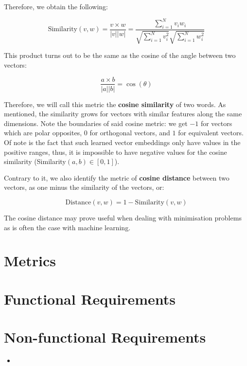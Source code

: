 Therefore, we obtain the following:

$$ \text{Similarity} (v, w) = \frac{v \times w}{|v| |w|} = \frac{\sum_{i=1}^{N} v_i w_i}{\sqrt{\sum_{i=1}^{N}v_i^2} \sqrt{\sum_{i=1}^{N}w_i^2}}$$

This product turns out to be the same as the cosine of the angle between two vectors:

$$ \frac{a \times b}{|a| |b|} = \cos(\theta) $$

Therefore, we will call this metric the \textbf{cosine similarity} of two words. As mentioned, the similarity grows for vectors with similar features along the same dimensions. Note the boundaries of said cosine metric: we get $-1$ for vectors which are polar opposites, $0$ for orthogonal vectors, and $1$ for equivalent vectors. Of note is the fact that such learned vector embeddings only have values in the positive ranges, thus, it is impossible to have negative values for the cosine similarity (Similarity$(a,b) \in [0,1]$).

Contrary to it, we also identify the metric of \textbf{cosine distance} between two vectors, as one minus the similarity of the vectors, or:

$$ \text{Distance}(v,w) = 1 - \text{Similarity}(v,w) $$

The cosine distance may prove useful when dealing with minimisation problems as is often the case with machine learning.

\section{Metrics}

\section{Functional Requirements}


\section{Non-functional Requirements}

\begin{itemize}
    \item 
\end{itemize}